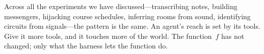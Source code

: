 \begin{intuition}
  Across all the experiments we have discussed---transcribing
  notes, building messengers, hijacking course schedules,
  inferring rooms from sound, identifying circuits from
  signals---the pattern is the same.  An agent's reach is set
  by its tools.  Give it more tools, and it touches more of
  the world.  The function~$f$ has not changed; only what
  the harness lets the function do.
\end{intuition}
